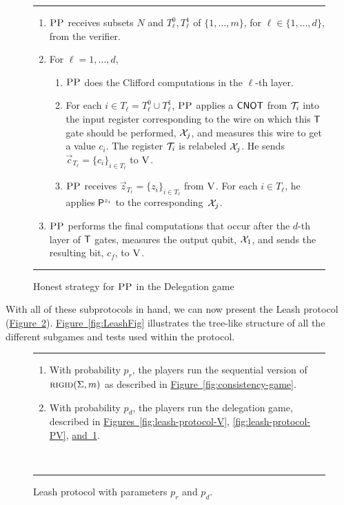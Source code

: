 \documentclass[11pt]{article}
\numberwithin{equation}{section}
\theoremstyle{definition}
\theoremstyle{plain}
\newcommand{\expref}[2]{\hyperref[#2]{#1~\ref{#2}}}
\newcommand{\rigid}{\textsc{rigid}}
\newcommand{\ver}{\textsc{V}}
\newcommand{\pp}{\textsc{PP}}
\begin{document}
  \begin{figure}[htbp]
\rule[1ex]{\textwidth}{0.5pt}
\vspace{-1.8em}
\begin{enumerate}
\item $\pp$ receives subsets $N$ and $T_\ell^0,T_\ell^1$ of $\{1,\ldots,m\}$, for $\ell\in\{1,\ldots,d\}$, from the verifier. 
\item For $\ell=1,\dots,d$, 
\begin{enumerate}
\item $\pp$ does the Clifford computations in the $\ell$-th layer.
 \item For each $i\in T_\ell = T_\ell^0\cup T_\ell^1$, $\pp$ applies a $\sf CNOT$ from ${\cal T}_i$ into the input register corresponding to the wire on which this $\sf T$ gate should be performed, ${\cal X}_{j}$, and measures this wire to get a value $c_i$. The register ${\cal T}_i$ is relabeled ${\cal X}_{j}$. He sends $\vec{c}_{T_\ell} = \{c_i\}_{i\in T_{\ell}}$ to $\ver$.
\item $\pp$ receives $\vec{z}_{T_{\ell}}=\{z_i\}_{i\in T_\ell}$ from $\ver$. For each $i\in T_\ell$, he applies ${\sf P}^{z_i}$ to the corresponding~${\cal X}_{j}$. 
\end{enumerate} 
\item $\pp$ performs the final computations that occur after the $d$-th layer of $\sf T$ gates, measures the output qubit, ${\cal X}_1$, and sends the resulting bit, $c_f$, to $\ver$. 
\end{enumerate}
\rule[2ex]{\textwidth}{0.5pt}\vspace{-.5cm}
\caption{Honest strategy for $\pp$  in the Delegation game}\label{fig:leash-protocol-PP}
\end{figure}




With all of these subprotocols in hand, we can now present the Leash protocol (\expref{Figure}{fig:leash-description}). \expref{Figure}{fig:LeashFig} illustrates the tree-like structure of all the different subgames and tests used within the protocol.

\begin{figure}[H]
\rule[1ex]{\textwidth}{0.5pt}
\vspace{-25pt}
\justify 
\begin{enumerate}
\item With probability $p_r$, the players run the sequential version of $\rigid(\Sigma,m)$ as described in \expref{Figure}{fig:consistency-game}.
\item With probability $p_d$, the players run the delegation game, described in \expref{Figures}{fig:leash-protocol-V}, \ref{fig:leash-protocol-PV}, \expref{and}{fig:leash-protocol-PP}.
\end{enumerate}
~\\
\rule[2ex]{\textwidth}{0.5pt}\vspace{-.5cm}
\caption{Leash protocol with parameters $p_r$ and $p_d$.}
\label{fig:leash-description}
\end{figure} 
\end{document}
